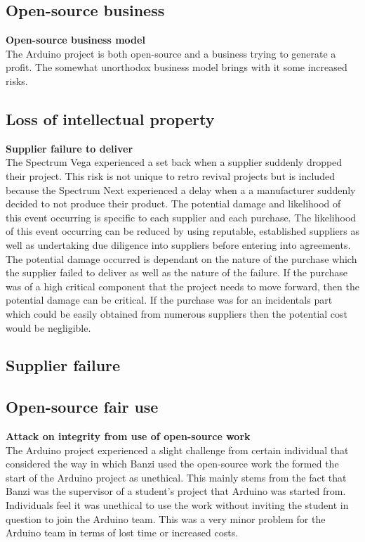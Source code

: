 \subsection{Open-source business}
\textbf{Open-source business model}\\
The Arduino project is both open-source and a business trying to generate a profit. The somewhat unorthodox business model brings with it some increased risks.\\

\subsection{Loss of intellectual property}
\textbf{Supplier failure to deliver}\\
The Spectrum Vega experienced a set back when a supplier suddenly dropped their project. This risk is not unique to retro revival projects but is included because the Spectrum Next experienced a delay when a a manufacturer suddenly decided to not produce their product. The potential damage and likelihood of this event occurring is specific to each supplier and each purchase. The likelihood of this event occurring can be reduced by using reputable, established suppliers as well as undertaking due diligence into suppliers before entering into agreements. The potential damage occurred is dependant on the nature of the purchase which the supplier failed to deliver as well as the nature of the failure. If the purchase was of a high critical component that the project needs to move forward, then the potential damage can be critical. If the purchase was for an incidentals part which could be easily obtained from numerous suppliers then the potential cost would be negligible.\\

\subsection{Supplier failure}

\subsection{Open-source fair use}

\textbf{Attack on integrity from use of open-source work}\\
The Arduino project experienced a slight challenge from certain individual that considered the way in which Banzi used the open-source work the formed the start of the Arduino project as unethical. This mainly stems from the fact that Banzi was the supervisor of a student's project that Arduino was started from. Individuals feel it was unethical to use the work without inviting the student in question to join the Arduino team. This was a very minor problem for the Arduino team in terms of lost time or increased costs. \\

